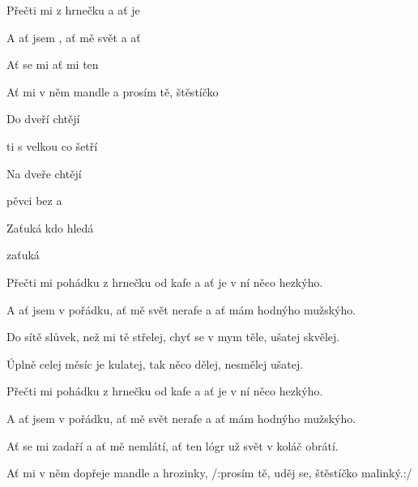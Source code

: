 

\zs
Přečti mi  z hrnečku 
a ať je  

A ať jsem , ať mě svět 
a ať  

Ať se mi  
ať mi ten  

Ať mi v něm  mandle a 
prosím tě,  štěstíčko 
\ks

\zr
Do dveří  chtějí 

ti s velkou  co šetří 

Na dveře  chtějí 

pěvci bez  a 

Zaťuká  kdo hledá 

zaťuká   
\kr

\zs
Přečti mi pohádku z hrnečku od kafe
a ať je v ní něco hezkýho.

A ať jsem v pořádku, ať mě svět nerafe
a ať mám hodnýho mužskýho.

Do sítě slůvek, než mi tě střelej,
chyť se v mym těle, ušatej skvělej.

Úplně celej měsíc je kulatej,
tak něco dělej, nesmělej ušatej.
\ks

\zr \kr

\zs
Přečti mi pohádku z hrnečku od kafe
a ať je v ní něco hezkýho.

A ať jsem v pořádku, ať mě svět nerafe
a ať mám hodnýho mužskýho.

Ať se mi zadaří a ať mě nemlátí,
ať ten lógr už svět v koláč obrátí.

Ať mi v něm dopřeje mandle a hrozinky,
/:prosím tě, uděj se, štěstíčko malinký.:/
\ks

\kp
